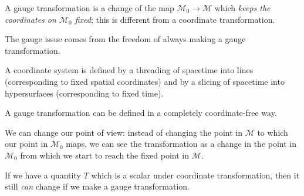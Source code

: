 \documentclass[main.tex]{subfiles}
\begin{document}
A gauge transformation is a change of the map \(\mathcal{M}_0 \to \mathcal{M}\) which \emph{keeps the coordinates on \(\mathcal{M}_0\) fixed}; this is different from a coordinate transformation.

The gauge issue comes from the freedom of always making a gauge transformation. 

A coordinate system is defined by a threading of spacetime into lines (corresponding to fixed spatial coordinates) and by a slicing of spacetime into hypersurfaces (corresponding to fixed time).

A gauge transformation can be defined in a completely coordinate-free way.

We can change our point of view: instead of changing the point in \(\mathcal{M}\) to which our point in \(\mathcal{M}_0\) maps, we can see the transformation as a change in the point in \(\mathcal{M}_0\) from which we start to reach the fixed point in \(\mathcal{M}\).

If we have a quantity \(T\) which is a scalar under coordinate transformation, then it still \emph{can} change if we make a gauge transformation. 
\end{document}
